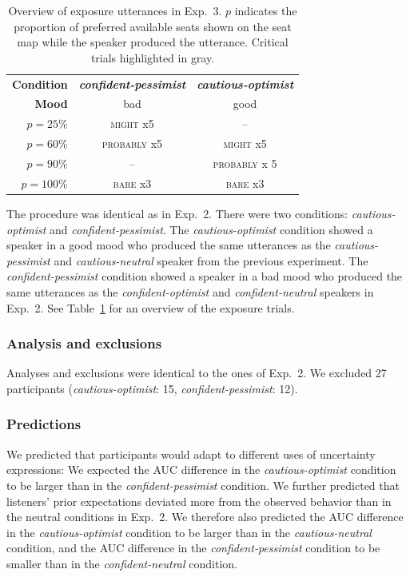 \documentclass[man,floatsintext]{apa6}
\begin{document}
\begin{table}
\centering
\begin{tabular}{r|c | c }
\toprule 
     \textbf{Condition} & \textit{\textbf{confident-pessimist}} & \textit{\textbf{cautious-optimist}} \\
     \textbf{Mood} & bad  & good  \\ \midrule
     $p=25\%$ & \textsc{might} x5 & -- \\
     \cellcolor{LightGray} $p=60\%$ &  \cellcolor{LightGray} \textsc{probably} x5 & \cellcolor{LightGray} \textsc{might} x5 \\
     $p=90\%$ & -- &  \textsc{probably} x 5  \\
     $p=100\%$ & {\textsc{bare} x3} & {\textsc{bare} x3} \\
     \bottomrule
\end{tabular}
\caption{Overview of exposure utterances in Exp.~3. $p$ indicates the proportion of preferred available seats shown on the seat map while the speaker produced the utterance. Critical trials highlighted in gray.\label{tbl:exposure-overview-exp3}}
\end{table}


The procedure was identical as in Exp.~2. There were two conditions: \textit{cautious-optimist} and \textit{confident-pessimist}. The \textit{cautious-optimist} condition showed a speaker in a good mood who produced the same utterances as the \textit{cautious-pessimist} and \textit{cautious-neutral} speaker from the previous experiment. The \textit{confident-pessimist} condition showed a speaker in a bad mood who produced the same utterances as the \textit{confident-optimist} and \textit{confident-neutral} speakers in Exp.~2. See Table~\ref{tbl:exposure-overview-exp3} for an overview of the exposure trials.

\subsubsection{Analysis and exclusions}

Analyses and exclusions were identical to the ones of Exp.~2. We excluded 27 participants (\textit{cautious-optimist}: 15, \textit{confident-pessimist}: 12).

\subsubsection{Predictions}

We predicted that participants would adapt to different uses of uncertainty expressions: We expected the AUC difference in the \textit{cautious-optimist} condition to be larger than in the \textit{confident-pessimist} condition. We further predicted that listeners' prior expectations deviated more from the observed behavior than in the neutral conditions in Exp.~2. We therefore also predicted the AUC difference in the \textit{cautious-optimist} condition to be larger than in the \textit{cautious-neutral} condition, and the AUC difference in the \textit{confident-pessimist} condition to be smaller than in the \textit{confident-neutral} condition.
\end{document}
